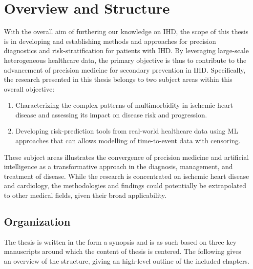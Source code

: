 \chapter{Overview and Structure} 
\label{chap:overview}

With the overall aim of furthering our knowledge on 
\ac{IHD}, the scope of this thesis is in
developing and establishing methods and approaches for 
precision diagnostics and risk-stratification 
for patients with \ac{IHD}. 
By leveraging large-scale heterogeneous healthcare data,
the primary objective is thus to contribute to the advancement of 
precision medicine for secondary prevention in \ac{IHD}.
Specifically, the research presented in this thesis belongs to  
two subject areas within this overall objective:

\begin{enumerate}
    \item Characterizing the complex patterns of multimorbidity in 
        ischemic heart disease and assessing its impact on 
        disease risk and progression.
    \item Developing risk-prediction tools from real-world healthcare 
        data using \ac{ML} approaches that can allows modelling of 
        time-to-event data with censoring.
\end{enumerate}

These subject areas illustrates 
the convergence of precision medicine and artificial
intelligence as a transformative approach in the diagnosis, management,
and treatment of disease.
While the research is concentrated on ischemic heart disease and cardiology,
the methodologies and findings could potentially be extrapolated to other
medical fields, given their broad applicability.

\section*{Organization}

The thesis is written in the form a synopsis 
and is as such based on three key manuscripts around 
which the content of thesis is centered.
The following gives an overview of the structure, 
giving an high-level outline of the included chapters.

